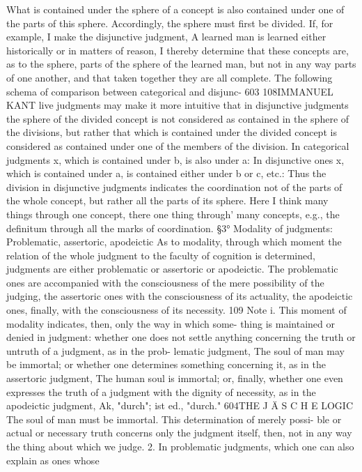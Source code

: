 What is contained under the sphere of a concept is also contained under
one of the parts of this sphere. Accordingly, the sphere must first be
divided. If, for example, I make the disjunctive judgment, A learned man is
learned either historically or in matters of reason, I thereby determine that
these concepts are, as to the sphere, parts of the sphere of the learned man,
but not in any way parts of one another, and that taken together they are all
complete.
The following schema of comparison between categorical and disjunc-
603
108IMMANUEL KANT
live judgments may make it more intuitive that in disjunctive judgments the
sphere of the divided concept is not considered as contained in the sphere
of the divisions, but rather that which is contained under the divided
concept is considered as contained under one of the members of the
division.
In categorical judgments x, which is contained under b, is also under a:
In disjunctive ones x, which is contained under a, is contained either under
b or c, etc.:
Thus the division in disjunctive judgments indicates the coordination not
of the parts of the whole concept, but rather all the parts of its sphere.
Here I think many things through one concept, there one thing through' many
concepts, e.g., the definitum through all the marks of coordination.
§3°
Modality of judgments: Problematic, assertoric, apodeictic
As to modality, through which moment the relation of the whole judgment
to the faculty of cognition is determined, judgments are either problematic
or assertoric or apodeictic. The problematic ones are accompanied with the
consciousness of the mere possibility of the judging, the assertoric ones
with the consciousness of its actuality, the apodeictic ones, finally, with the
consciousness of its necessity.
109
Note i. This moment of modality indicates, then, only the way in which some-
thing is maintained or denied in judgment: whether one does not settle
anything concerning the truth or untruth of a judgment, as in the prob-
lematic judgment, The soul of man may be immortal; or whether one
determines something concerning it, as in the assertoric judgment, The
human soul is immortal; or, finally, whether one even expresses the truth
of a judgment with the dignity of necessity, as in the apodeictic judgment,
Ak, "durch"; ist ed., "durch."
604THE J Ä S C H E LOGIC
The soul of man must be immortal. This determination of merely possi-
ble or actual or necessary truth concerns only the judgment itself, then, not
in any way the thing about which we judge.
2. In problematic judgments, which one can also explain as ones whose

